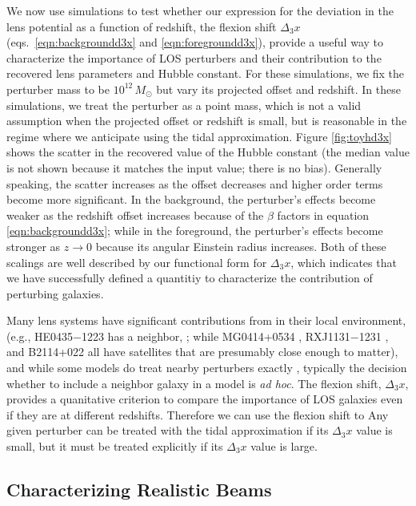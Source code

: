 \documentclass{emulateapj}
\begin{document}
We now use simulations to test whether our expression for the deviation in the lens potential as a function of redshift, the flexion shift $\Delta_3 x$ (eqs.\ \ref{eqn:backgroundd3x} and \ref{eqn:foregroundd3x}), provide a useful way to characterize the importance of LOS perturbers and their contribution to the recovered lens parameters and Hubble constant. For these simulations, we fix the perturber mass to be $10^{12}\,M_\odot$ but vary its projected offset and redshift. In these simulations, we treat the perturber as a point mass, which is not a valid assumption when the projected offset or redshift is small, but is reasonable in the regime where we anticipate using the tidal approximation.  Figure \ref{fig:toyhd3x} shows the scatter in the recovered value of the Hubble constant (the median value is not shown because it matches the input value; there is no bias).  Generally speaking, the scatter increases as the offset decreases and higher order terms become more significant. In the background, the perturber's effects become weaker as the redshift offset increases because of the $\beta$ factors in equation \ref{eqn:backgroundd3x}; while in the foreground, the perturber's effects become stronger as $z \to 0$ because its angular Einstein radius increases.  Both of these scalings are well described by our functional form for $\Delta_3 x$, which indicates that we have successfully defined a quantitiy to characterize the contribution of perturbing galaxies. 

Many lens systems have significant contributions from in their local environment, (e.g., HE0435$-$1223 has a neighbor, \citealt{Kochanek06}; while MG0414+0534 \citep{Tonry99}, RXJ1131$-$1231 \citep{Sluse03}, and B2114+022 \citep{King99} all have satellites that are presumably close enough to matter), and while some models do treat nearby perturbers exactly \citep[e.g.,][]{Kochanek06, Fadely12}, typically the decision whether to include a neighbor galaxy in a model is \textit{ad hoc}. The flexion shift, $\Delta_3 x$, provides a quanitative criterion to compare the importance of LOS galaxies even if they are at different redshifts. Therefore we can use the flexion shift to  Any given perturber can be treated with the tidal approximation if its $\Delta_3 x$ value is small, but it must be treated explicitly if its $\Delta_3 x$ value is large.

\subsection{Characterizing Realistic Beams\label{sec:Environments}}
\end{document}
